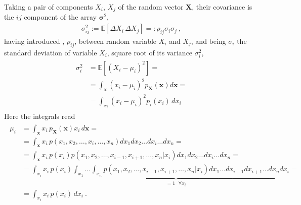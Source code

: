 \documentclass[letterpaper,10pt,english]{jupyterBook}
\begin{document}
\begin{itemize}
\sphinxAtStartPar
Taking a pair of components \(X_i\), \(X_j\) of the random vector \(\mathbf{X}\), their covariance is the \(ij\) component of the array \(\boldsymbol{\sigma}^2\),
\begin{equation*}
\begin{split}\sigma^2_{ij} := \mathbb{E}\left[ \Delta X_i \, \Delta X_j \right] =: \rho_{ij} \sigma_i \sigma_j \ ,\end{split}
\end{equation*}
\sphinxAtStartPar
having introduced , \(\rho_{ij}\), between random variable \(X_i\) and \(X_j\), and being \(\sigma_i\) the standard deviation of variable \(X_i\), square root of its variance \(\sigma^2_i\),
\begin{equation*}
\begin{split}\begin{aligned}
    \sigma^2_i 
    & = \mathbb{E}\left[ \left( X_i - \mu_i \right)^2  \right] = \\
    & = \int_{\mathbf{x}} (x_i - \mu_i)^2 p_{\mathbf{X}}(\mathbf{x}) d \mathbf{x} = \\
    & = \int_{x_i} (x_i - \mu_i)^2 p_i (x_i) \, d x_i 
  \end{aligned}\end{split}
\end{equation*}
\sphinxAtStartPar
Here the integrals read
\begin{equation*}
\begin{split}\begin{aligned}
    \mu_i 
    & = \int_{\mathbf{x}} x_i \, p_{\mathbf{X}}(\mathbf{x}) x_i \, d \mathbf{x} = \\
    & = \int_{\mathbf{x}} x_i \, p(x_1, x_2, \dots, x_i, \dots, x_n) d x_1 d x_2 \dots d x_i \dots d x_n = \\
    & = \int_{\mathbf{x}} x_i \, p(x_i) p(x_1, x_2, \dots, x_{i-1}, x_{i+1}, \dots, x_n | x_i) d x_1 d x_2 \dots d x_i \dots d x_n = \\
    & = \int_{x_i} x_i \, p(x_i) \underbrace{\int_{x_1} \dots \int_{x_n} p(x_1, x_2, \dots, x_{i-1}, x_{i+1}, \dots, x_n | x_i) d x_1 \dots d x_{i-1} d x_{i+1} \dots d x_n}_{= 1 \text{ $\forall x_i$}} d x_i = \\
    & = \int_{x_i} x_i \, p(x_i) \, d x_i \ .
  \end{aligned}\end{split}
\end{equation*}
\end{itemize}
\end{document}
